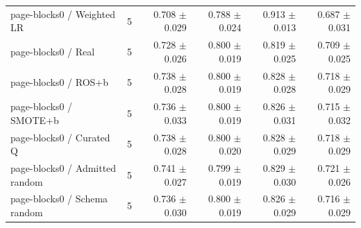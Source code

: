 \begin{longtable}{lrrrrr}
page-blocks0 / Weighted LR & 5 & 0.708 $\pm$ 0.029 & 0.788 $\pm$ 0.024 & 0.913 $\pm$ 0.013 & 0.687 $\pm$ 0.031 \\
page-blocks0 / Real & 5 & 0.728 $\pm$ 0.026 & 0.800 $\pm$ 0.019 & 0.819 $\pm$ 0.025 & 0.709 $\pm$ 0.025 \\
page-blocks0 / ROS+b & 5 & 0.738 $\pm$ 0.028 & 0.800 $\pm$ 0.019 & 0.828 $\pm$ 0.028 & 0.718 $\pm$ 0.029 \\
page-blocks0 / SMOTE+b & 5 & 0.736 $\pm$ 0.033 & 0.800 $\pm$ 0.019 & 0.826 $\pm$ 0.031 & 0.715 $\pm$ 0.032 \\
page-blocks0 / Curated Q & 5 & 0.738 $\pm$ 0.028 & 0.800 $\pm$ 0.020 & 0.828 $\pm$ 0.029 & 0.718 $\pm$ 0.029 \\
page-blocks0 / Admitted random & 5 & 0.741 $\pm$ 0.027 & 0.799 $\pm$ 0.019 & 0.829 $\pm$ 0.030 & 0.721 $\pm$ 0.026 \\
page-blocks0 / Schema random & 5 & 0.736 $\pm$ 0.030 & 0.800 $\pm$ 0.019 & 0.826 $\pm$ 0.029 & 0.716 $\pm$ 0.029 \\
\bottomrule\end{longtable}
